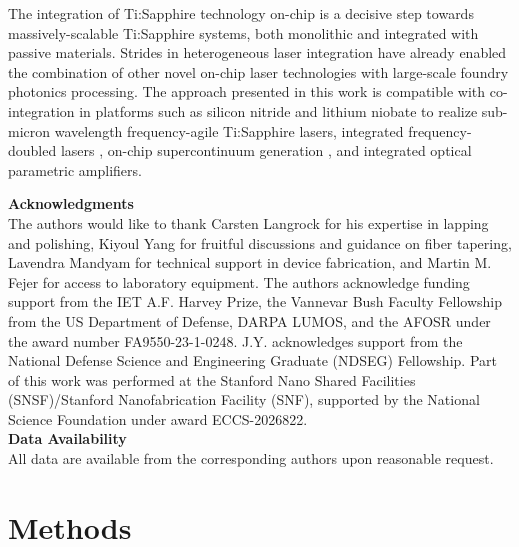 \documentclass[amsmath, amsthm, amssymb, aps, prb, superscriptaddress, twocolumn, nofootinbib, 10pt]{revtex4-1}%
\begin{document}
The integration of Ti:Sapphire technology on-chip is a decisive step towards massively-scalable Ti:Sapphire systems, both monolithic and integrated with passive materials. Strides in heterogeneous laser integration have already enabled the combination of other novel on-chip laser technologies with large-scale foundry photonics processing\cite{tran2022extending, xiang20233d}. The approach presented in this work is compatible with co-integration in platforms such as silicon nitride and lithium niobate to realize sub-micron wavelength frequency-agile Ti:Sapphire lasers, integrated frequency-doubled lasers \cite{li2022integrated}, on-chip supercontinuum generation \cite{zhao2015visible}, and integrated optical parametric amplifiers\cite{ledezma2022intense}.


\noindent\textbf{Acknowledgments}\\
\noindent 
The authors would like to thank Carsten Langrock for his expertise in lapping and polishing, Kiyoul Yang for fruitful discussions and guidance on fiber tapering, Lavendra Mandyam for technical support in device fabrication, and Martin M. Fejer for access to laboratory equipment. The authors acknowledge funding support from the IET A.F. Harvey Prize, the Vannevar Bush Faculty Fellowship from the US Department of Defense, DARPA LUMOS, and the AFOSR under the award number FA9550-23-1-0248. J.Y. acknowledges support from the National Defense Science and Engineering Graduate (NDSEG) Fellowship. Part of this work was performed at the Stanford Nano Shared Facilities (SNSF)/Stanford Nanofabrication Facility (SNF), supported by the National Science Foundation under award ECCS-2026822.
\\

\noindent\textbf{Data Availability}\\
\noindent All data are available from the corresponding authors upon reasonable request.


\clearpage 

\section*{Methods}
\end{document}
